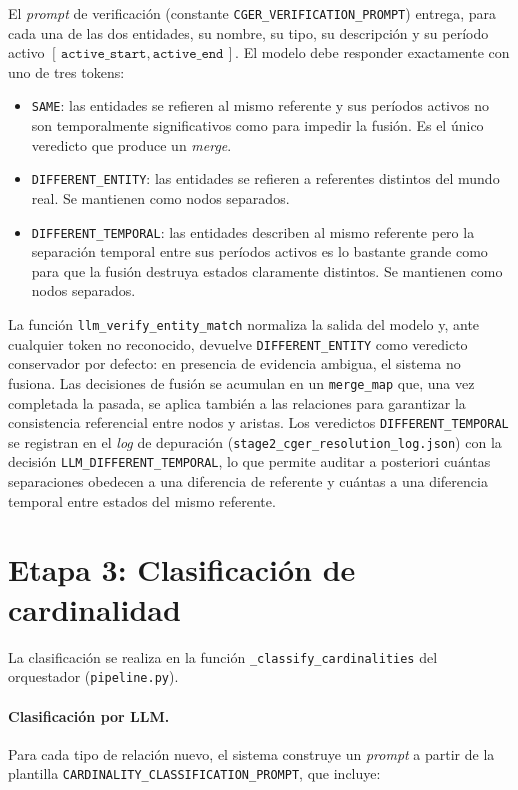 El \emph{prompt} de verificación (constante \texttt{CGER\_VERIFICATION\_PROMPT}) entrega, para cada una de las dos entidades, su nombre, su tipo, su descripción y su período activo $[\,\texttt{active\_start}, \texttt{active\_end}\,]$. El modelo debe responder exactamente con uno de tres tokens:

\begin{itemize}
  \item \texttt{SAME}: las entidades se refieren al mismo referente y sus períodos activos no son temporalmente significativos como para impedir la fusión. Es el único veredicto que produce un \emph{merge}.
  \item \texttt{DIFFERENT\_ENTITY}: las entidades se refieren a referentes distintos del mundo real. Se mantienen como nodos separados.
  \item \texttt{DIFFERENT\_TEMPORAL}: las entidades describen al mismo referente pero la separación temporal entre sus períodos activos es lo bastante grande como para que la fusión destruya estados claramente distintos. Se mantienen como nodos separados.
\end{itemize}

La función \texttt{llm\_verify\_entity\_match} normaliza la salida del modelo y, ante cualquier token no reconocido, devuelve \texttt{DIFFERENT\_ENTITY} como veredicto conservador por defecto: en presencia de evidencia ambigua, el sistema no fusiona. Las decisiones de fusión se acumulan en un \texttt{merge\_map} que, una vez completada la pasada, se aplica también a las relaciones para garantizar la consistencia referencial entre nodos y aristas. Los veredictos \texttt{DIFFERENT\_TEMPORAL} se registran en el \emph{log} de depuración (\texttt{stage2\_cger\_resolution\_log.json}) con la decisión \texttt{LLM\_DIFFERENT\_TEMPORAL}, lo que permite auditar a posteriori cuántas separaciones obedecen a una diferencia de referente y cuántas a una diferencia temporal entre estados del mismo referente.

\section{Etapa 3: Clasificación de cardinalidad}\label{sec:impl-cardinality}

La clasificación se realiza en la función \texttt{\_classify\_cardinalities} del orquestador (\texttt{pipeline.py}).

\paragraph{Clasificación por LLM.}
Para cada tipo de relación nuevo, el sistema construye un \emph{prompt} a partir de la plantilla \texttt{CARDINALITY\_CLASSIFICATION\_PROMPT}, que incluye:

